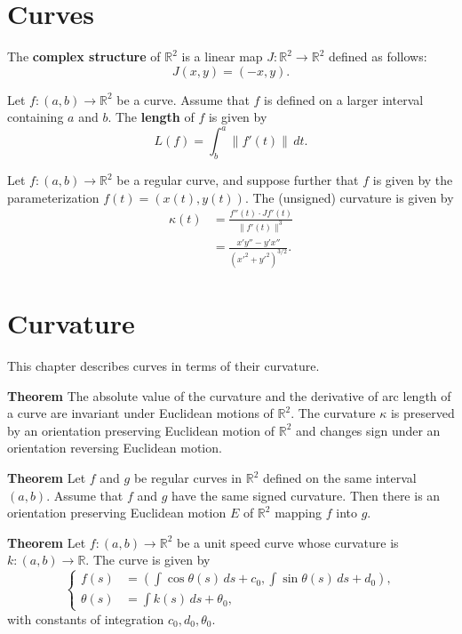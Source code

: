 \documentclass{book}
\begin{document}
	\chapter{Curves}
	
		The \textbf{complex structure} of $\mathbb{R}^2$ is a linear map $J:\mathbb{R}^2\rightarrow\mathbb{R}^2$ defined as follows:
		\begin{equation}
			J(x,y)=(-x,y)\mathrm{.}
		\end{equation} 
		
		Let $f:(a,b)\rightarrow\mathbb{R}^2$ be a curve. Assume that $f$ is defined on a larger interval containing $a$ and $b$. The \textbf{length} of $f$ is given by
		\begin{equation}
			L(f)=\int^a_b{\|f'(t)\|\,dt}\mathrm{.}
		\end{equation}
		
		Let $f:(a,b)\rightarrow\mathbb{R}^2$ be a regular curve, and suppose further that $f$ is given by the parameterization $f(t)=(x(t),y(t))$. The (unsigned) curvature is given by
		\begin{align}
			\kappa(t)&=\frac{f''(t)\cdot Jf'(t)}{\|f'(t)\|^3}\\
			&=\frac{x'y''-y'x''}{(x'^2+y'^2)^{3/2}}\mathrm{.}
		\end{align}
		
	\chapter{Curvature}
		This chapter describes curves in terms of their curvature.
	
		\textbf{Theorem} The absolute value of the curvature and the derivative of arc length of a curve are invariant under Euclidean motions of $\mathbb{R}^2$. The curvature $\kappa$ is preserved by an orientation preserving Euclidean motion of $\mathbb{R}^2$ and changes sign under an orientation reversing Euclidean motion.
		
		\textbf{Theorem} Let $f$ and $g$ be regular curves in $\mathbb{R}^2$ defined on the same interval $(a,b)$. Assume that $f$ and $g$ have the same signed curvature. Then there is an orientation preserving Euclidean motion $E$ of $\mathbb{R}^2$ mapping $f$ into $g$.
		
		\textbf{Theorem} Let $f:(a,b)\rightarrow\mathbb{R}^2$ be a unit speed curve whose curvature is $k:(a,b)\rightarrow\mathbb{R}$. The curve is given by
		\begin{equation*}
			\left\{
			\begin{aligned}
				f(s)&=\left(\int\cos{\theta(s)\,ds}+c_0,\int\sin{\theta(s)\,ds+d_0}\right),\\
				\theta(s)&=\int{k(s)\,ds}+\theta_0,
			\end{aligned}
			\right.
		\end{equation*}
		with constants of integration $c_0, d_0, \theta_0$.
		
\end{document}
